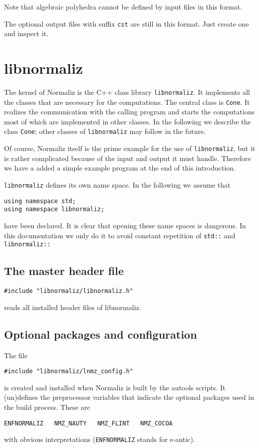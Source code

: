 \documentclass[12pt,a4paper]{scrartcl}
\theoremstyle{definition}
\begin{document}
Note that algebraic polyhedra cannot be defined by input files in this format.

The optional output files  with suffix \verb|cst| are still in this format. Just create one and inspect it.

\section{libnormaliz}\label{libnorm}

\begin{small}

The kernel of Normaliz is the C++ class library \verb|libnormaliz|. It implements all the classes that are necessary for the computations. The central class is \verb|Cone|. It realizes the communication with the calling program and starts the computations most of which are implemented in other classes. In the following we describe the class \verb|Cone|; other classes of \verb|libnormaliz| may follow in the future.

Of course, Normaliz itself is the prime example for the use of \verb|libnormaliz|, but it is rather complicated because of the input and output it must handle. Therefore we have a added a simple example program at the end of this introduction.

\verb|libnormaliz| defines its own name space. In the following we assume that
\begin{Verbatim}
using namespace std;
using namespace libnormaliz;
\end{Verbatim}
have been declared. It is clear that opening these name spaces is dangerous. In this documentation we only do it to avoid constant repetition of \verb|std::| and \verb|libnormaliz::|

\subsection{The master header file}

\begin{Verbatim}
#include "libnormaliz/libnormaliz.h"
\end{Verbatim}
 reads all installed header files of libnormaliz.
 
 \subsection{Optional packages and configuration}
 
 The file 
\begin{Verbatim}
#include "libnormaliz/lnmz_config.h"
\end{Verbatim}
is created and installed when Normaliz is built by the autools scripts. It  (un)defines the preprocessor variables that indicate the optional packages used in the build process. These are
\begin{Verbatim}
ENFNORMALIZ   NMZ_NAUTY   NMZ_FLINT   NMZ_COCOA 
\end{Verbatim}
with obvious interpretations (\verb|ENFNORMALIZ| stands for e-antic).


\end{small}
\end{document}
